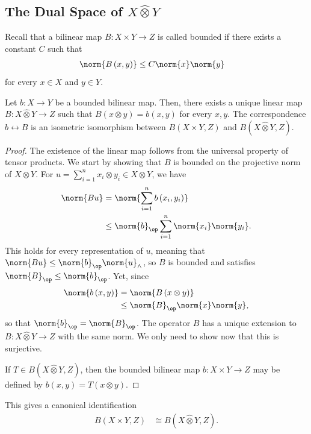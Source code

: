\documentclass[10pt]{mypackage}
\begin{document}
\subsection{The Dual Space of $X\hat\otimes Y$}%
Recall that a bilinear map $B\colon X\times Y\rightarrow Z$ is called bounded if there exists a constant $C$ such that
\begin{align*}
  \norm{B\left( x,y \right)} &\leq C\norm{x}\norm{y}
\end{align*}
for every $x\in X$ and $y\in Y$.
\begin{theorem}
  Let $b\colon X\rightarrow Y$ be a bounded bilinear map. Then, there exists a unique linear map $B\colon X\hat\otimes Y\rightarrow Z$ such that $B\left( x\otimes y \right) = b\left( x,y \right)$ for every $x,y$. The correspondence $b\leftrightarrow B$ is an isometric isomorphism between $B\left( X\times Y,Z \right)$ and $B\left( X\hat\otimes Y,Z \right)$.
\end{theorem}
\begin{proof}
  The existence of the linear map follows from the universal property of tensor products. We start by showing that $B$ is bounded on the projective norm of $X\otimes Y$. For $u= \sum_{i=1}^{n}x_i\otimes y_i\in X\otimes Y$, we have
  \begin{align*}
    \norm{Bu} &= \norm{\sum_{i=1}^{n}b\left( x_i,y_i \right)}\\
              &\leq \norm{b}_{\op}\sum_{i=1}^{n}\norm{x_i}\norm{y_i}.
  \end{align*}
  This holds for every representation of $u$, meaning that $\norm{Bu}\leq \norm{b}_{\op}\norm{u}_{\wedge}$, so $B$ is bounded and satisfies $\norm{B}_{\op}\leq \norm{b}_{\op}$. Yet, since
  \begin{align*}
    \norm{b\left( x,y \right)} &= \norm{B\left( x\otimes y \right)}\\
                               &\leq \norm{B}_{\op}\norm{x}\norm{y},
  \end{align*}
  so that $\norm{b}_{\op} = \norm{B}_{\op}$. The operator $B$ has a unique extension to $ B\colon X\hat\otimes Y\rightarrow Z $ with the same norm. We only need to show now that this is surjective.

  If $T\in B\left( X\hat\otimes Y,Z \right)$, then the bounded bilinear map $b\colon X\times Y\rightarrow Z$ may be defined by $b\left( x,y \right) = T\left( x\otimes y \right)$.
\end{proof}
This gives a canonical identification
\begin{align*}
  B\left( X\times Y,Z \right) &\cong B\left( X\hat\otimes Y,Z \right).
\end{align*}
\end{document}
